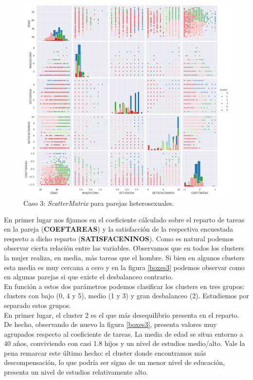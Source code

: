\documentclass[11pt,a4paper]{article}
\begin{document}
	\begin{figure}[] 
		\centering
		\includegraphics[scale=0.5]{../Caso3/hetero/scatter_matrix}
		\caption{Caso 3: \emph{ScatterMatrix} para parejas heterosexuales.}
		\label{scattermatrix3}
	\end{figure}

	En primer lugar nos fijamos en el coeficiente cálculado sobre el reparto de tareas en la pareja (\textbf{COEFTAREAS}) y la satisfacción de la respectiva encuestada respecto a dicho reparto (\textbf{SATISFACENINOS}). Como es natural podemos observar cierta relación entre las variables. Observamos que en todos los clusters la mujer realiza, en media, más tareas que el hombre. Si bien en algunos clusters esta media es muy cercana a cero y en la figura \ref{boxes3} podemos observar como en algunas parejas si que existe el desbalanceo contrario. \\
	
	En función a estos dos parámetros podemos clasificar los clusters en tres grupos: clusters con bajo (0, 4 y 5), medio (1 y 3) y gran desbalanceo (2). Estudiemos por separado estos grupos. \\
	
	En primer lugar, el cluster 2 es el que más desequilibrio presenta en el reparto. De hecho, observando de nuevo la figura \ref{boxes3}, presenta valores muy agrupados respecto al coeficiente de tareas. La media de edad se situa entorno a 40 años, conviviendo con casi 1.8 hijos y un nivel de estudios medio/alto. Vale la pena remarcar este último hecho: el cluster donde encontramos más descompensación, lo que podría ser signo de un menor nivel de educación, presenta un nivel de estudios relativamente alto. \\
	
\end{document}
